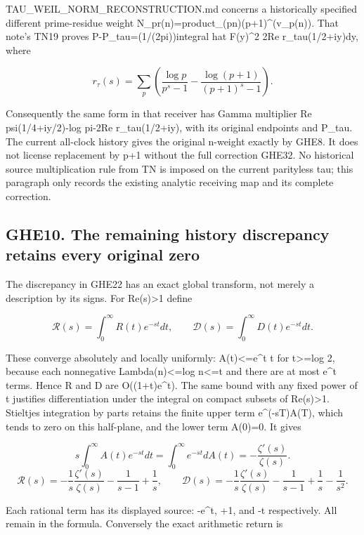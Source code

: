 TAU\_WEIL\_NORM\_RECONSTRUCTION.md concerns a historically specified
different prime-residue weight
N\_pr(n)=product\_(p\textbar n)(p+1)\^{}(v\_p(n)). That note's TN19
proves P-P\_tau=(1/(2pi))integral \textbar hat F(y)\textbar\^{}2 2Re
r\_tau(1/2+iy)dy, where

\[
r_\tau(s)=\sum_p\left(\frac{\log p}{p^s-1}
-\frac{\log(p+1)}{(p+1)^s-1}\right).
\tag{GHE32}
\]

Consequently the same form in that receiver has Gamma multiplier Re
psi(1/4+iy/2)-log pi-2Re r\_tau(1/2+iy), with its original endpoints and
P\_tau. The current all-clock history gives the original n-weight
exactly by GHE8. It does not license replacement by p+1 without the full
correction GHE32. No historical source multiplication rule from TN is
imposed on the current parityless tau; this paragraph only records the
existing analytic receiving map and its complete correction.

\subsection{GHE10. The remaining history discrepancy retains every
original
zero}\label{ghe10.-the-remaining-history-discrepancy-retains-every-original-zero}

The discrepancy in GHE22 has an exact global transform, not merely a
description by its signs. For Re(s)\textgreater1 define

\[
\mathscr R(s)=\int_0^\infty R(t)e^{-st}dt,
\qquad \mathscr D(s)=\int_0^\infty D(t)e^{-st}dt.
\tag{GHE33}
\]

These converge absolutely and locally uniformly: A(t)\textless=e\^{}t t
for t\textgreater=log 2, because each nonnegative Lambda(n)\textless=log
n\textless=t and there are at most e\^{}t terms. Hence R and D are
O((1+t)e\^{}t). The same bound with any fixed power of t justifies
differentiation under the integral on compact subsets of
Re(s)\textgreater1. Stieltjes integration by parts retains the finite
upper term e\^{}(-sT)A(T), which tends to zero on this half-plane, and
the lower term A(0)=0. It gives

\[
s\int_0^\infty A(t)e^{-st}dt
=\int_0^\infty e^{-st}dA(t)
=-\frac{\zeta'(s)}{\zeta(s)}.
\] \[
\boxed{\mathscr R(s)=-\frac1s\frac{\zeta'(s)}{\zeta(s)}
-\frac1{s-1}+\frac1s,\qquad
\mathscr D(s)=-\frac1s\frac{\zeta'(s)}{\zeta(s)}
-\frac1{s-1}+\frac1s-\frac1{s^2}.}
\tag{GHE34}
\]

Each rational term has its displayed source: -e\^{}t, +1, and -t
respectively. All remain in the formula. Conversely the exact arithmetic
return is

